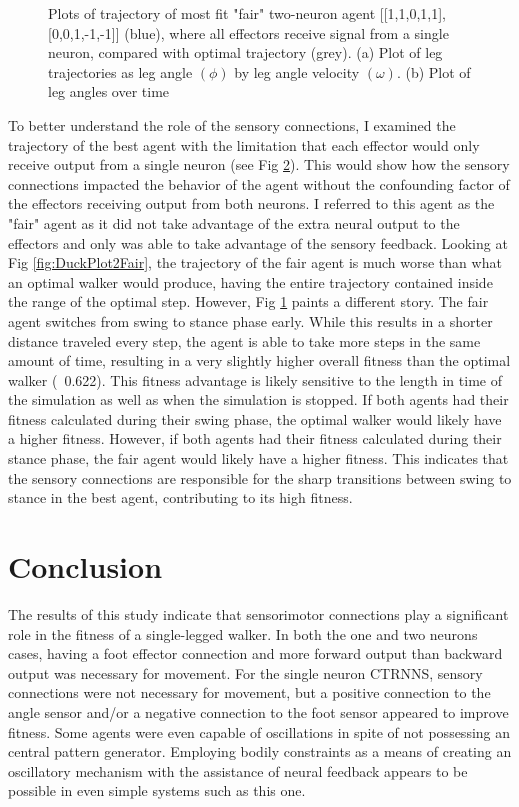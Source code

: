 \documentclass{article}
\begin{document}
\begin{figure}[htbp]
\begin{subfigure}[b]{0.5\textwidth}
    \caption{}
    \label{fig:AngleTimePlot2Fair}
  \end{subfigure}
  \caption{Plots of trajectory of most fit "fair" two-neuron agent [[1,1,0,1,1],[0,0,1,-1,-1]] (blue), where all effectors receive signal from a single neuron, compared with optimal trajectory (grey). (a) Plot of leg trajectories as leg angle \((\phi)\) by leg angle velocity \((\omega)\). (b) Plot of leg angles over time}
  \label{fig:plots2Fair}
\end{figure} 

To better understand the role of the sensory connections, I examined the trajectory of the best agent with the limitation that each effector would only receive output from a single neuron (see Fig \ref{fig:plots2Fair}). This would show how the sensory connections impacted the behavior of the agent without the confounding factor of the effectors receiving output from both neurons. I referred to this agent as the "fair" agent as it did not take advantage of the extra neural output to the effectors and only was able to take advantage of the sensory feedback. Looking at Fig \ref{fig:DuckPlot2Fair}, the trajectory of the fair agent is much worse than what an optimal walker would produce, having the entire trajectory contained inside the range of the optimal step. However, Fig \ref{fig:AngleTimePlot2Fair} paints a different story. The fair agent switches from swing to stance phase early. While this results in a shorter distance traveled every step, the agent is able to take more steps in the same amount of time, resulting in a very slightly higher overall fitness than the optimal walker (~0.622). This fitness advantage is likely sensitive to the length in time of the simulation as well as when the simulation is stopped. If both agents had their fitness calculated during their swing phase, the optimal walker would likely have a higher fitness. However, if both agents had their fitness calculated during their stance phase, the fair agent would likely have a higher fitness. This indicates that the sensory connections are responsible for the sharp transitions between swing to stance in the best agent, contributing to its high fitness.

\section{Conclusion}

The results of this study indicate that sensorimotor connections play a significant role in the fitness of a single-legged walker. In both the one and two neurons cases, having a foot effector connection and more forward output than backward output was necessary for movement. For the single neuron CTRNNS, sensory connections were not necessary for movement, but a positive connection to the angle sensor and/or a negative connection to the foot sensor appeared to improve fitness. Some agents were even capable of oscillations in spite of not possessing an central pattern generator. Employing bodily constraints as a means of creating an oscillatory mechanism with the assistance of neural feedback appears to be possible in even simple systems such as this one.
\end{document}
